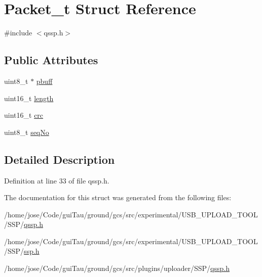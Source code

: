 \hypertarget{struct_packet__t}{\section{Packet\-\_\-t Struct Reference}
\label{struct_packet__t}
}


{\ttfamily \#include $<$qssp.\-h$>$}

\subsection*{Public Attributes}
\begin{DoxyCompactItemize}
\item 
uint8\-\_\-t $\ast$ \hyperlink{group___uploader_gab5babc1942e0edfe9e5f21458ba20048}{pbuff}
\item 
uint16\-\_\-t \hyperlink{group___uploader_ga0913fea37a151d66203855de5adfe013}{length}
\item 
uint16\-\_\-t \hyperlink{group___uploader_gacdbb361acbb12c670984915ffd83f70e}{crc}
\item 
uint8\-\_\-t \hyperlink{group___uploader_ga9f51d41b7233025b207d9a47188a684b}{seq\-No}
\end{DoxyCompactItemize}


\subsection{Detailed Description}


Definition at line 33 of file qssp.\-h.



The documentation for this struct was generated from the following files\-:\begin{DoxyCompactItemize}
\item 
/home/jose/\-Code/gui\-Tau/ground/gcs/src/experimental/\-U\-S\-B\-\_\-\-U\-P\-L\-O\-A\-D\-\_\-\-T\-O\-O\-L/\-S\-S\-P/\hyperlink{experimental_2_u_s_b___u_p_l_o_a_d___t_o_o_l_2_s_s_p_2qssp_8h}{qssp.\-h}\item 
/home/jose/\-Code/gui\-Tau/ground/gcs/src/experimental/\-U\-S\-B\-\_\-\-U\-P\-L\-O\-A\-D\-\_\-\-T\-O\-O\-L/\-S\-S\-P/\hyperlink{ssp_8h}{ssp.\-h}\item 
/home/jose/\-Code/gui\-Tau/ground/gcs/src/plugins/uploader/\-S\-S\-P/\hyperlink{plugins_2uploader_2_s_s_p_2qssp_8h}{qssp.\-h}\end{DoxyCompactItemize}
